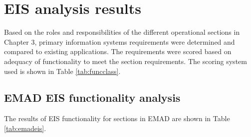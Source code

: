 \section{EIS analysis results}
Based on the roles and responsibilities of the different operational sections in Chapter 3, primary information systems requirements were determined and compared to existing applications. The requirements were scored based on adequacy of functionality to meet the section requirements. The scoring system used is shown in Table \ref{tab:funcclass}.

\subsection{EMAD EIS functionality analysis}

The results of EIS functionality for sections in EMAD are shown in Table \ref{tab:emadeis}.

